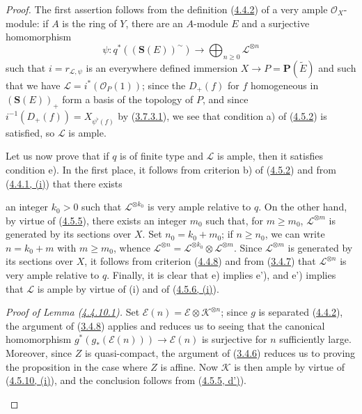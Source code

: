\begin{proof}
The first assertion follows from the definition
(\hyperref[II.4.4.2]{4.4.2}) of a very ample $\mathcal{O}_X$-module: if
$A$ is the ring of $Y$, there are an $A$-module $E$ and a surjective
homomorphism
\[
  \psi:q^*((\mathbf{S}(E))^{\sim})\longrightarrow
  \bigoplus_{n\geq0}\mathcal{L}^{\otimes n}
\]
such that $i=r_{\mathcal{L},\psi}$ is an everywhere defined immersion
$X\to P=\mathbf{P}(\widetilde{E})$ and such that we have
$\mathcal{L}=i^*(\mathcal{O}_P(1))$; since the $D_+(f)$ for $f$ homogeneous
in $(\mathbf{S}(E))_+$ form a basis of the topology of $P$, and since
$i^{-1}(D_+(f))=X_{\psi^\flat(f)}$ by
(\hyperref[II.3.7.3.1]{3.7.3.1}), we see that condition a) of
(\hyperref[II.4.5.2]{4.5.2}) is satisfied, so $\mathcal{L}$ is ample.

Let us now prove that if $q$ is of finite type and $\mathcal{L}$ is
ample, then it satisfies condition e). In the first place, it follows from criterion b)
of (\hyperref[II.4.5.2]{4.5.2}) and from
(\hyperref[II.4.4.1]{4.4.1, (i)}) that there exists


an integer $k_0>0$ such that $\mathcal{L}^{\otimes k_0}$ is very ample
relative to $q$. On the other hand, by virtue of
(\hyperref[II.4.5.5]{4.5.5}), there exists an integer $m_0$ such that, for
$m\geq m_0$, $\mathcal{L}^{\otimes m}$ is generated by its sections
over $X$. Set $n_0=k_0+m_0$; if $n\geq n_0$, we can write
$n=k_0+m$ with $m\geq m_0$, whence
$\mathcal{L}^{\otimes n}
=\mathcal{L}^{\otimes k_0}\otimes\mathcal{L}^{\otimes m}$. Since
$\mathcal{L}^{\otimes m}$ is generated by its sections over $X$, it
follows from criterion (\hyperref[II.4.4.8]{4.4.8}) and from
(\hyperref[II.3.4.7]{3.4.7}) that $\mathcal{L}^{\otimes n}$ is very ample
relative to $q$. Finally, it is clear that e) implies e'), and e') implies
that $\mathcal{L}$ is ample by virtue of (i) and of
(\hyperref[II.4.5.6]{4.5.6, (i)}).

\begin{env}[4.5.10.1]
\label{II.4.5.10.1}
\emph{Proof of Lemma (\hyperref[II.4.4.10.1]{4.4.10.1}).} Set
$\mathcal{E}(n)=\mathcal{E}\otimes\mathcal{K}^{\otimes n}$; since $g$ is
separated (\hyperref[II.4.4.2]{4.4.2}), the argument of
(\hyperref[II.3.4.8]{3.4.8}) applies and reduces us to seeing that
the canonical homomorphism
$g^*(g_*(\mathcal{E}(n)))\to\mathcal{E}(n)$ is surjective for $n$ sufficiently
large. Moreover, since $Z$ is quasi-compact, the argument of
(\hyperref[II.3.4.6]{3.4.6}) reduces us to proving the proposition in the case
where $Z$ is affine. Now $\mathcal{K}$ is then ample by virtue of
(\hyperref[II.4.5.10]{4.5.10, (i)}), and the conclusion follows from
(\hyperref[II.4.5.5]{4.5.5, d')}).
\end{env}
\end{proof}

